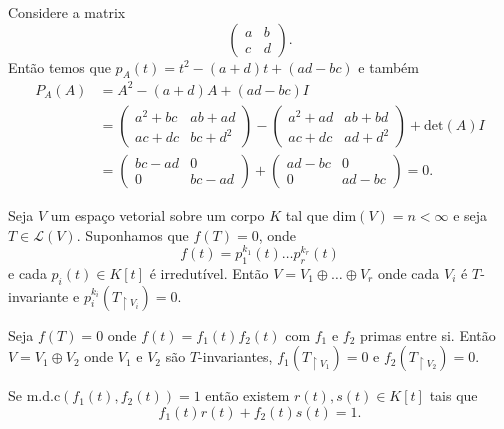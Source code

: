 \documentclass[11pt,twoside,a4paper]{book}
\begin{document}
\begin{exemplo}
Considere a matrix\[\begin{pmatrix}
                    a & b \\ c & d
                    \end{pmatrix}.\]
 Então temos que \(p_A(t)=t^2-(a+d)t+(ad-bc)\) e também
\begin{align*}
P_A(A)&=A^2-(a+d)A+(ad-bc)I\\
      &=
\begin{pmatrix} a^2+bc & ab+ad\\ac+dc & bc+d^2\end{pmatrix}
-\begin{pmatrix} a^2+ad & ab+bd \\ ac+dc & ad+d^2\end{pmatrix}
 + \text{det}(A)I
 \\&=\begin{pmatrix}bc-ad & 0 \\ 0 & bc- ad\end{pmatrix}
   + \begin{pmatrix}ad-bc & 0 \\ 0 & ad - bc\end{pmatrix} = 0.
                                     \end{align*}
                                 \end{exemplo}
\begin{teorema}
Seja \(V\) um espaço vetorial sobre um corpo \(K\) tal que
\(\text{dim}(V)=n<\infty\) e seja \(T\in\mathcal{L}(V)\). Suponhamos que
\(f(T)=0\), onde \[f(t)=p_1^{k_1}(t)\ldots p_r^{k_r}(t)\] e cada
\(p_i(t)\in
K[t]\) é irredutível. Então \(V=V_1\oplus\ldots\oplus V_r\) onde
cada \(V_i\) é \(T\)-invariante e \(p_i^{k_i}(T_{\upharpoonright V_i})=0\).
                     \end{teorema}
\begin{lema}
  Seja \(f(T)=0\) onde \(f(t)=f_1(t)f_2(t)\) com
  \(f_1\) e \(f_2\) primas entre si. Então \(V=V_1\oplus V_2\)
  onde \(V_1\) e \(V_2\) são \(T\)-invariantes,
  \(f_1(T_{\upharpoonright V_1})=0\) e \(f_2(T_{\upharpoonright V_2})=0\).
\end{lema}
\begin{sublema}
Se \(\text{m.d.c}(f_1(t),f_2(t))=1\) então existem
\mbox{\(r(t),s(t)\in K[t]\)} tais que
\[f_1(t)r(t)+f_2(t)s(t)=1.\]
\end{sublema}
\end{document}
